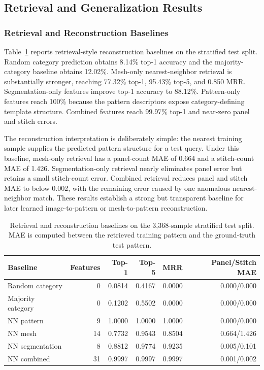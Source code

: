 \documentclass[pdflatex,sn-mathphys-num]{sn-jnl}
\begin{document}
\subsection{Retrieval and Generalization Results}

\subsubsection{Retrieval and Reconstruction Baselines}

Table~\ref{tab:retrieval} reports retrieval-style reconstruction baselines on the stratified test split. Random category prediction obtains 8.14\% top-1 accuracy and the majority-category baseline obtains 12.02\%. Mesh-only nearest-neighbor retrieval is substantially stronger, reaching 77.32\% top-1, 95.43\% top-5, and 0.850 MRR. Segmentation-only features improve top-1 accuracy to 88.12\%. Pattern-only features reach 100\% because the pattern descriptors expose category-defining template structure. Combined features reach 99.97\% top-1 and near-zero panel and stitch errors.

The reconstruction interpretation is deliberately simple: the nearest training sample supplies the predicted pattern structure for a test query. Under this baseline, mesh-only retrieval has a panel-count MAE of 0.664 and a stitch-count MAE of 1.426. Segmentation-only retrieval nearly eliminates panel error but retains a small stitch-count error. Combined retrieval reduces panel and stitch MAE to below 0.002, with the remaining error caused by one anomalous nearest-neighbor match. These results establish a strong but transparent baseline for later learned image-to-pattern or mesh-to-pattern reconstruction.

\begin{table}[!htbp]
\caption{Retrieval and reconstruction baselines on the 3,368-sample stratified test split. MAE is computed between the retrieved training pattern and the ground-truth test pattern.}\label{tab:retrieval}
\centering
\begin{tabular}{lrrrrr}
\toprule
Baseline & Features & Top-1 & Top-5 & MRR & Panel/Stitch MAE \\
\midrule
Random category & 0 & 0.0814 & 0.4167 & 0.0000 & 0.000/0.000 \\
Majority category & 0 & 0.1202 & 0.5502 & 0.0000 & 0.000/0.000 \\
NN pattern & 9 & 1.0000 & 1.0000 & 1.0000 & 0.000/0.000 \\
NN mesh & 14 & 0.7732 & 0.9543 & 0.8504 & 0.664/1.426 \\
NN segmentation & 8 & 0.8812 & 0.9774 & 0.9235 & 0.005/0.101 \\
NN combined & 31 & 0.9997 & 0.9997 & 0.9997 & 0.001/0.002 \\
\bottomrule
\end{tabular}
\end{table}
\end{document}
